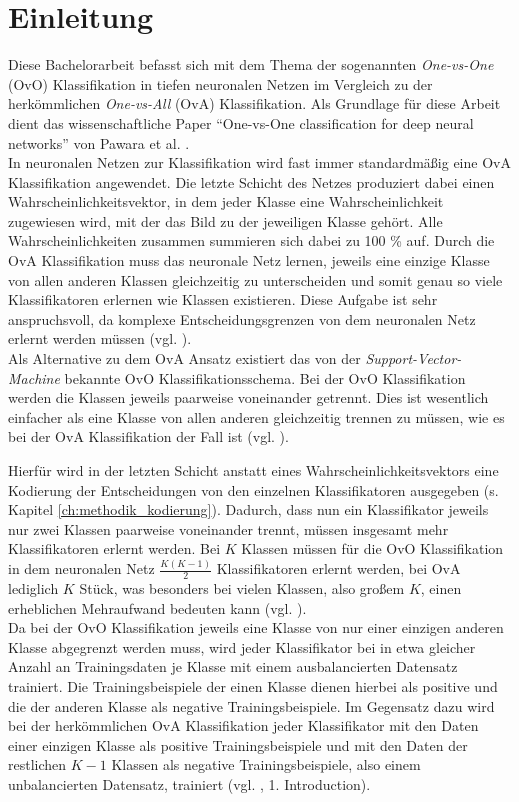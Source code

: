 \chapter{Einleitung}
\label{ch:einleitung}
Diese Bachelorarbeit befasst sich mit dem Thema der sogenannten \textit{One-vs-One} (OvO) Klassifikation in tiefen neuronalen Netzen im Vergleich zu der herkömmlichen \textit{One-vs-All} (OvA) Klassifikation. Als Grundlage für diese Arbeit dient das wissenschaftliche Paper \enquote{One-vs-One classification for deep neural networks} von Pawara et al. \cite{pawaraPaper}.\\

In neuronalen Netzen zur Klassifikation wird fast immer standardmäßig eine OvA Klassifikation angewendet. Die letzte Schicht des Netzes produziert dabei einen Wahrscheinlichkeitsvektor, in dem jeder Klasse eine Wahrscheinlichkeit zugewiesen wird, mit der das Bild zu der jeweiligen Klasse gehört. Alle Wahrscheinlichkeiten zusammen summieren sich dabei zu 100 \% auf. Durch die OvA Klassifikation muss das neuronale Netz lernen, jeweils eine einzige Klasse von allen anderen Klassen gleichzeitig zu unterscheiden und somit genau so viele Klassifikatoren erlernen wie Klassen existieren. Diese Aufgabe ist sehr anspruchsvoll, da komplexe Entscheidungsgrenzen von dem neuronalen Netz erlernt werden müssen (vgl. \cite{pawaraPaper}).\\

Als Alternative zu dem OvA Ansatz existiert das von der \textit{Support-Vector-Machine} bekannte OvO Klassifikationsschema. Bei der OvO Klassifikation werden die Klassen jeweils paarweise voneinander getrennt. Dies ist wesentlich einfacher als eine Klasse von allen anderen gleichzeitig trennen zu müssen, wie es bei der OvA Klassifikation der Fall ist (vgl. \cite{pawaraPaper}).

Hierfür wird in der letzten Schicht anstatt eines Wahrscheinlichkeitsvektors eine Kodierung der Entscheidungen von den einzelnen Klassifikatoren ausgegeben (s. Kapitel \ref{ch:methodik_kodierung}).
Dadurch, dass nun ein Klassifikator jeweils nur zwei Klassen paarweise voneinander trennt, müssen insgesamt mehr Klassifikatoren erlernt werden.
Bei $K$ Klassen müssen für die OvO Klassifikation in dem neuronalen Netz $\frac{K(K-1)}{2}$ Klassifikatoren erlernt werden, bei OvA lediglich $K$ Stück, was besonders bei vielen Klassen, also großem $K$, einen erheblichen Mehraufwand bedeuten kann (vgl. \cite{pawaraPaper}).\\

Da bei der OvO Klassifikation jeweils eine Klasse von nur einer einzigen anderen Klasse abgegrenzt werden muss, wird jeder Klassifikator bei in etwa gleicher Anzahl an Trainingsdaten je Klasse mit einem ausbalancierten Datensatz trainiert. Die Trainingsbeispiele der einen Klasse dienen hierbei als positive und die der anderen Klasse als negative Trainingsbeispiele.
Im Gegensatz dazu wird bei der herkömmlichen OvA Klassifikation jeder Klassifikator mit den Daten einer einzigen Klasse als positive Trainingsbeispiele und mit den Daten der restlichen $K-1$ Klassen als negative Trainingsbeispiele, also einem unbalancierten Datensatz, trainiert (vgl. \cite{pawaraPaper}, 1. Introduction).\\

